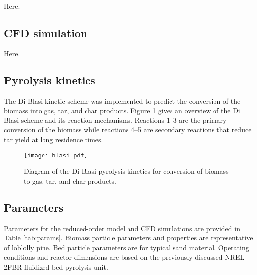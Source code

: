 Here.

\subsection{CFD simulation}

Here.

\subsection{Pyrolysis kinetics}

The Di Blasi kinetic scheme was implemented to predict the conversion of the biomass into gas, tar, and char products. Figure \ref{fig:blasi} gives an overview of the Di Blasi scheme and its reaction mechanisms. Reactions 1--3 are the primary conversion of the biomass while reactions 4--5 are secondary reactions that reduce tar yield at long residence times.

\begin{figure}[H]
    \centering
    \texttt{[image: blasi.pdf]}
    \caption{Diagram of the Di Blasi pyrolysis kinetics for conversion of biomass to gas, tar, and char products.}
    \label{fig:blasi}
\end{figure}

\subsection{Parameters}

Parameters for the reduced-order model and CFD simulations are provided in Table \ref{tab:params}. Biomass particle parameters and properties are representative of loblolly pine. Bed particle parameters are for typical sand material. Operating conditions and reactor dimensions are based on the previously discussed NREL 2FBR fluidized bed pyrolysis unit.


